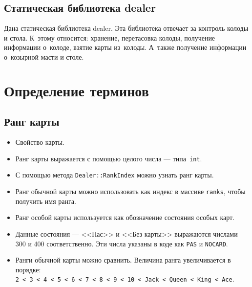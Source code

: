 \documentclass[a4paper,12pt]{article}
\begin{document}
    \subsection{Статическая библиотека \textsf{dealer}}
        Дана статическая библиотека \textsf{dealer}.
        Эта библиотека отвечает за контроль колоды и стола.
        К~этому относится: хранение, перетасовка колоды, получение информации о~колоде, взятие карты из~колоды.
        А~также получение информации о~козырной масти и столе.
    
    \section{Определение терминов}
        \subsection{Ранг карты}
            \begin{itemize}
                \item[] Свойство карты.
                \item[] Ранг карты выражается с помощью целого числа --- типа~\texttt{int}.
                \item[] С помощью метода \texttt{Dealer::RankIndex} можно узнать ранг карты.
                \item[] Ранг обычной карты можно использовать как индекс в массиве \texttt{ranks}, чтобы получить имя ранга.
                \item[] Ранг особой карты используется как обозначение состояния особых карт.
                \item[] Данные состояния --- <<Пас>> и <<Без карты>> выражаются числами 300 и 400 соответственно.
                        Эти числа указаны в коде как \texttt{PAS} и \texttt{NOCARD}.
                \item[] Ранги обычной карты можно сравнить.
                        Величина ранга увеличивается в порядке:\\
                        \texttt{2 < 3 < 4 < 5 < 6 < 7 < 8 < 9 < 10 < Jack < Queen < King < Ace}.
            \end{itemize}
\end{document}
